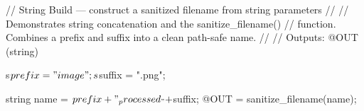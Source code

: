 // String Build — construct a sanitized filename from string parameters
//
// Demonstrates string concatenation and the sanitize_filename()
// function. Combines a prefix and suffix into a clean path-safe name.
//
// Outputs: @OUT (string)

s$prefix = "image";
s$suffix = ".png";

string name = $prefix + "_processed_" + $suffix;
@OUT = sanitize_filename(name);
